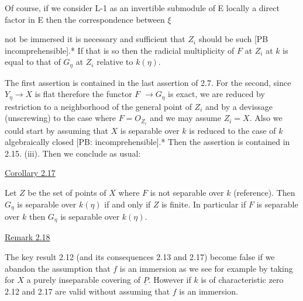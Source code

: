 \documentclass[11pt]{article}
\newcommand{\scanpage}[1]{\par\bigskip\noindent{\small\sffamily[scan #1]}\par}
\newcommand{\mspage}[1]{{\small\sffamily[p.\,#1]}}
\newcommand{\uline}[1]{\underline{#1}}
\begin{document}
Of course, if we consider L-1 as an invertible submodule of E
locally a direct factor in E then the correspondence between $\xi$

\clearpage
\scanpage{24/18}
\mspage{18}

not be immersed it is necessary and sufficient that $Z_i$ should be
such [PB incomprehensible].* If that is so then the radicial
multiplicity of $F$ at $Z_i$ at $k$ is equal to that of $G_\eta$ at $Z_i$ relative
to $k(\eta)$.

The first assertion is contained in the last assertion of
2.7. For the second, since $Y_\eta \rightarrow X$ is flat therefore the functor $F$
$\rightarrow G_\eta$ is exact, we are reduced by restriction to a neighborhood of
the general point of $Z_i$ and by a devissage (unscrewing) to the case
where $F = O_{Z_i}$ and we may assume $Z_i = X$. Also we could start by
assuming that $X$ is separable over $k$ is reduced to the case of $k$
algebraically closed [PB: incomprehensible].* Then the assertion
is contained in 2.15. (iii). Then we conclude as usual:

\uline{Corollary 2.17}

Let $Z$ be the set of points of $X$ where $F$ is not separable over
$k$ (reference). Then $G_\eta$ is separable over $k(\eta)$ if and only if $Z$ is
finite. In particular if $F$ is separable over $k$ then $G_\eta$ is
separable over $k(\eta)$.

\uline{Remark 2.18}

The key result 2.12 (and its consequences 2.13 and 2.17)
become false if we abandon the assumption that $f$ is an immersion
as we see for example by taking for $X$ a purely inseparable
covering of $\underline{P}$. However if $k$ is of characteristic zero 2.12 and
2.17 are valid without assuming that $f$ is an immersion.

\clearpage
\scanpage{24/37}
\mspage{37}
\end{document}
